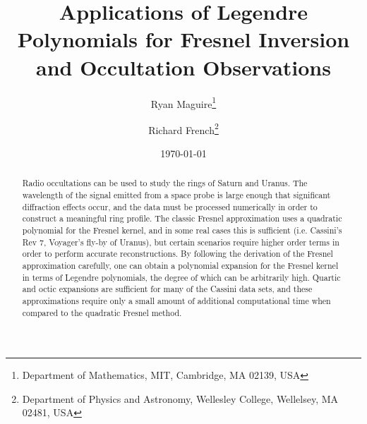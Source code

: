 \documentclass{article}
\title{%
    Applications of Legendre Polynomials for
    Fresnel Inversion and Occultation Observations%
}
\author{%
    Ryan Maguire\footnote{%
        Department of Mathematics,
        MIT, Cambridge, MA 02139, USA
    }
    \and
    Richard French\footnote{
        Department of Physics and Astronomy,
        Wellesley College, Wellelsey, MA 02481, USA
    }
}
\date{\today}
\theoremstyle{plain}
\begin{document}
    \maketitle
    \begin{abstract}
        Radio occultations can be used to study the rings of Saturn and
        Uranus. The wavelength of the signal emitted from a space probe is
        large enough that significant diffraction effects occur,
        and the data must be processed numerically in order to construct a
        meaningful ring profile. The classic Fresnel approximation uses a
        quadratic polynomial for the Fresnel kernel, and in some real cases
        this is sufficient (i.e. Cassini's Rev 7, Voyager's fly-by of Uranus),
        but certain scenarios require higher order terms in order to perform
        accurate reconstructions. By following the derivation of the
        Fresnel approximation carefully, one can obtain a polynomial expansion
        for the Fresnel kernel in terms of Legendre polynomials, the degree
        of which can be arbitrarily high. Quartic and octic
        expansions are sufficient for many of the Cassini data
        sets, and these approximations require only a small amount of
        additional computational time when compared to the quadratic Fresnel
        method.
    \end{abstract}
    \tableofcontents
\end{document}
